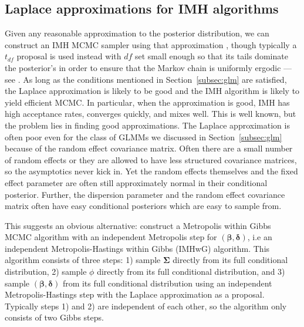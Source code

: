 \documentclass[12pt]{article}
\begin{document}
\subsection{Laplace approximations for IMH algorithms}\label{subsec:laplaceimh}
Given any reasonable approximation to the posterior distribution, we can construct an IMH MCMC sampler using that approximation \citep[Chapter~7.4]{robert2013monte}, though typically a $t_{df}$ proposal is used instead with $df$ set small enough so that its tails dominate the posterior's in order to ensure that the Markov chain is uniformly ergodic --- see \citet[Theorem~7.8]{robert2013monte}. As long as the conditions mentioned in Section~\ref{subsec:glm} are satisfied, the Laplace approximation is likely to be good and the IMH algorithm is likely to yield efficient MCMC. In particular, when the approximation is good, IMH has high acceptance rates, converges quickly, and mixes well. This is well known, but the problem lies in finding good approximations. The Laplace approximation is often poor even for the class of GLMMs we discussed in Section~\ref{subsec:glm} because of the random effect covariance matrix. Often there are a small number of random effects or they are allowed to have less structured covariance matrices, so the asymptotics never kick in. Yet the random effects themselves and the fixed effect parameter are often still approximately normal in their conditional posterior. Further, the dispersion parameter and the random effect covariance matrix often have easy conditional posteriors which are easy to sample from.

This suggests an obvious alternative: construct a Metropolis within Gibbs MCMC algorithm \citep[Chapter~10.3]{robert2013monte} with an independent Metropolis step for $(\bm{\beta}, \bm{\delta})$, i.e an independent Metropolis-Hastings within Gibbs (IMHwG) algorithm. This algorithm consists of three steps: 1) sample $\bm{\Sigma}$ directly from its full conditional distribution, 2) sample $\phi$ directly from its full conditional distribution, and 3) sample $(\bm{\beta}, \bm{\delta})$ from its full conditional distribution using an independent Metropolis-Hastings step with the Laplace approximation as a proposal. Typically steps 1) and 2) are independent of each other, so the algorithm only consists of two Gibbs steps.
\end{document}
